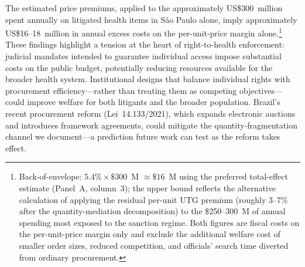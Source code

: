 The estimated price premiums, applied to the approximately US\$300~million spent annually on litigated health items in S\~ao Paulo alone, imply approximately US\$16--18~million in annual excess costs on the per-unit-price margin alone.\footnote{Back-of-envelope: $5.4\% \times \$300$~M $\approx \$16$~M using the preferred total-effect estimate (Panel~A, column~3); the upper bound reflects the alternative calculation of applying the residual per-unit UTG premium (roughly 3--7\% after the quantity-mediation decomposition) to the \$250--300~M of annual spending most exposed to the sanction regime. Both figures are fiscal costs on the per-unit-price margin only and exclude the additional welfare cost of smaller order sizes, reduced competition, and officials' search time diverted from ordinary procurement.} These findings highlight a tension at the heart of right-to-health enforcement: judicial mandates intended to guarantee individual access impose substantial costs on the public budget, potentially reducing resources available for the broader health system. Institutional designs that balance individual rights with procurement efficiency---rather than treating them as competing objectives---could improve welfare for both litigants and the broader population. Brazil's recent procurement reform (Lei~14.133/2021), which expands electronic auctions and introduces framework agreements, could mitigate the quantity-fragmentation channel we document---a prediction future work can test as the reform takes effect.
